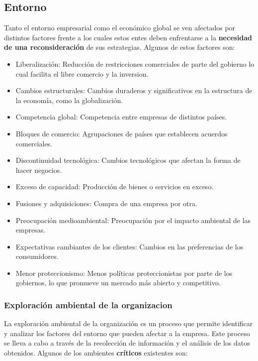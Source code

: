 \documentclass{templateNote}
\begin{document}
\subsection{Entorno}
\noindent Tanto el entorno empresarial como el económico global se ven afectados por distintos factores frente a los cuales estos entes 
    deben enfrentarse a la \textbf{necesidad de una reconsideración} de sus estrategias. Algunos de estos factores son:\\

\begin{itemize}
    \item Liberalización: Reducción de restricciones comerciales de parte del gobierno lo cual facilita el libre comercio y la inversion.
    \item Cambios estructurales: Cambios duraderos y significativos en la estructura de la economía, como la globalización.
    \item Competencia global: Competencia entre empresas de distintos países.
    \item Bloques de comercio: Agrupaciones de países que establecen acuerdos comerciales.
    \item Discontinuidad tecnológica: Cambios tecnológicos que afectan la forma de hacer negocios.
    \item Exceso de capacidad: Producción de bienes o servicios en exceso.
    \item Fusiones y adquisiciones: Compra de una empresa por otra.
    \item Preocupación medioambiental: Preocupación por el impacto ambiental de las empresas.
    \item Expectativas cambiantes de los clientes: Cambios en las preferencias de los consumidores.
    \item Menor proteccionismo: Menos políticas proteccionistas por parte de los gobiernos, lo que promueve un mercado más abierto y competitivo.
\end{itemize}

\subsubsection{Exploración ambiental de la organizacion}
\noindent La exploración ambiental de la organización es un proceso que permite identificar y analizar los factores del entorno que pueden afectar a la empresa. 
    Este proceso se lleva a cabo a través de la recolección de información y el análisis de los datos obtenidos. Algunos de los ambientes \textbf{críticos} existentes son:
\end{document}

